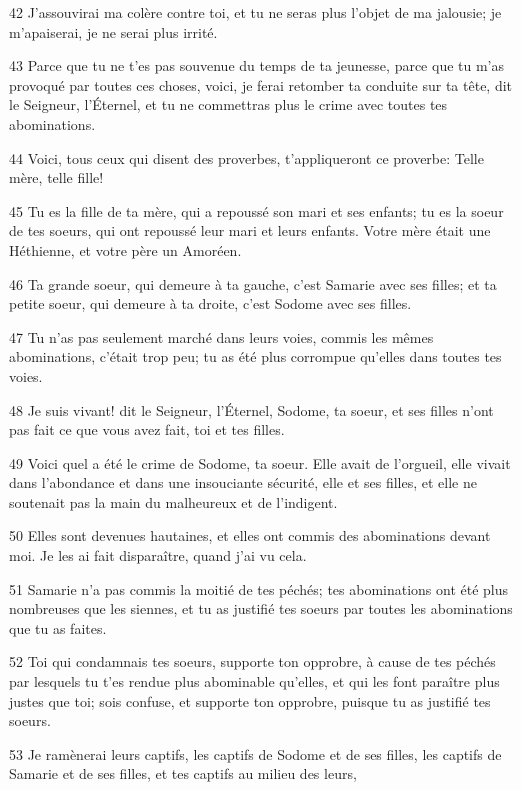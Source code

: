 \par 42 J'assouvirai ma colère contre toi, et tu ne seras plus l'objet de ma jalousie; je m'apaiserai, je ne serai plus irrité.
\par 43 Parce que tu ne t'es pas souvenue du temps de ta jeunesse, parce que tu m'as provoqué par toutes ces choses, voici, je ferai retomber ta conduite sur ta tête, dit le Seigneur, l'Éternel, et tu ne commettras plus le crime avec toutes tes abominations.
\par 44 Voici, tous ceux qui disent des proverbes, t'appliqueront ce proverbe: Telle mère, telle fille!
\par 45 Tu es la fille de ta mère, qui a repoussé son mari et ses enfants; tu es la soeur de tes soeurs, qui ont repoussé leur mari et leurs enfants. Votre mère était une Héthienne, et votre père un Amoréen.
\par 46 Ta grande soeur, qui demeure à ta gauche, c'est Samarie avec ses filles; et ta petite soeur, qui demeure à ta droite, c'est Sodome avec ses filles.
\par 47 Tu n'as pas seulement marché dans leurs voies, commis les mêmes abominations, c'était trop peu; tu as été plus corrompue qu'elles dans toutes tes voies.
\par 48 Je suis vivant! dit le Seigneur, l'Éternel, Sodome, ta soeur, et ses filles n'ont pas fait ce que vous avez fait, toi et tes filles.
\par 49 Voici quel a été le crime de Sodome, ta soeur. Elle avait de l'orgueil, elle vivait dans l'abondance et dans une insouciante sécurité, elle et ses filles, et elle ne soutenait pas la main du malheureux et de l'indigent.
\par 50 Elles sont devenues hautaines, et elles ont commis des abominations devant moi. Je les ai fait disparaître, quand j'ai vu cela.
\par 51 Samarie n'a pas commis la moitié de tes péchés; tes abominations ont été plus nombreuses que les siennes, et tu as justifié tes soeurs par toutes les abominations que tu as faites.
\par 52 Toi qui condamnais tes soeurs, supporte ton opprobre, à cause de tes péchés par lesquels tu t'es rendue plus abominable qu'elles, et qui les font paraître plus justes que toi; sois confuse, et supporte ton opprobre, puisque tu as justifié tes soeurs.
\par 53 Je ramènerai leurs captifs, les captifs de Sodome et de ses filles, les captifs de Samarie et de ses filles, et tes captifs au milieu des leurs,
